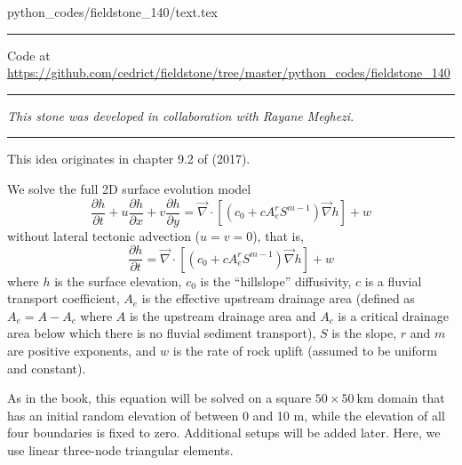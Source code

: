 \begin{flushright} {\tiny {\color{gray} python\_codes/fieldstone\_140/text.tex}} \end{flushright}



\par\noindent\rule{\textwidth}{0.4pt}

\begin{center}
Code at \url{https://github.com/cedrict/fieldstone/tree/master/python_codes/fieldstone_140}
\end{center}

\par\noindent\rule{\textwidth}{0.4pt}

{\sl This stone was developed in collaboration with Rayane Meghezi}. 

\par\noindent\rule{\textwidth}{0.4pt}

This \stone idea originates in chapter 9.2 of \textcite{simp17} (2017). 

We solve the full 2D surface evolution model 
\begin{equation}
\frac{\partial h}{\partial t}
+ u \frac{\partial h}{\partial x}
+ v \frac{\partial h}{\partial y}
= \vec\nabla\cdot \left[ (c_0 + c A_e^r S^{m-1}) \vec\nabla h \right] + w
\end{equation}
without lateral tectonic advection ($u=v=0$), that is,
\begin{equation}
\frac{\partial h}{\partial t}
= \vec\nabla\cdot \left[ (c_0 + c A_e^r S^{m-1}) \vec\nabla h \right] + w
\end{equation}
where $h$ is the surface elevation, 
$c_0$ is the ``hillslope'' diffusivity, 
$c$ is a fluvial transport coefficient, $A_e$ 
is the effective upstream drainage area (defined as $A_e = A - A_c$ 
where $A$ is the upstream drainage
area and $A_c$ is a critical drainage area below which there is no fluvial sediment transport),
$S$ is the slope, 
$r$ and $m$ are positive exponents, and $w$ is the rate of rock uplift (assumed to be uniform and constant).

As in the book, this equation will be solved on a square $50\times 50~\si{\km}$ 
domain that has an initial random elevation of
between 0 and 10 m, while the elevation of all four boundaries is fixed to zero. 
Additional setups will be added later. Here, we use linear three-node triangular elements.

